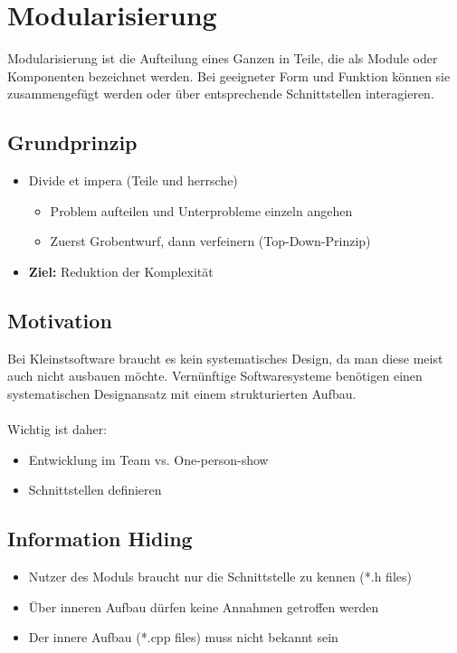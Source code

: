 \section{Modularisierung}
Modularisierung ist die Aufteilung eines Ganzen in Teile, die als Module oder Komponenten bezeichnet werden. Bei geeigneter Form und Funktion können sie zusammengefügt werden oder über entsprechende Schnittstellen interagieren.

\subsection{Grundprinzip}
\begin{itemize}
  \item Divide et impera (Teile und herrsche)
  \begin{itemize}
    \item Problem aufteilen und Unterprobleme einzeln angehen
    \item Zuerst Grobentwurf, dann verfeinern (Top-Down-Prinzip)
  \end{itemize}
  \item \textbf{Ziel:} Reduktion der Komplexität
\end{itemize}

\subsection{Motivation}
Bei Kleinstsoftware braucht es kein systematisches Design, da man diese meist auch nicht ausbauen möchte. Vernünftige Softwaresysteme benötigen einen systematischen Designansatz mit einem strukturierten Aufbau.\\\\
Wichtig ist daher:
\begin{itemize}
	\item Entwicklung im Team vs. One-person-show
	\item Schnittstellen definieren
\end{itemize}

\subsection{Information Hiding}
\begin{itemize}
  \item Nutzer des Moduls braucht nur die Schnittstelle zu kennen (*.h files)
  \item Über inneren Aufbau dürfen keine Annahmen getroffen werden
  \item Der innere Aufbau (*.cpp files) muss nicht bekannt sein
\end{itemize}

